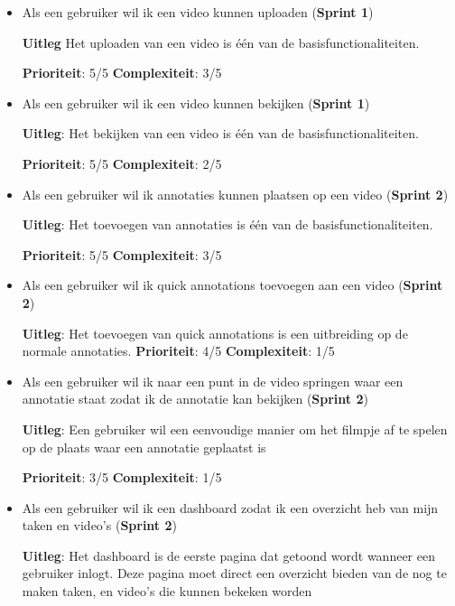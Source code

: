 \begin{itemize}
\setlength\itemsep{2em}
 \item Als een gebruiker wil ik een video kunnen uploaden (\textbf{Sprint 1})
        
        \textbf{Uitleg} Het uploaden van een video is \'e\'en van de basisfunctionaliteiten.
        
        \textbf{Prioriteit}: 5/5  \textbf{Complexiteit}: 3/5
        
 \item Als een gebruiker wil ik een video kunnen bekijken (\textbf{Sprint 1})

        \textbf{Uitleg}: Het bekijken van een video is \'e\'en van de basisfunctionaliteiten.

        \textbf{Prioriteit}: 5/5 \textbf{Complexiteit}: 2/5
        
 \item Als een gebruiker wil ik annotaties kunnen plaatsen op een video (\textbf{Sprint 2})

        \textbf{Uitleg}: Het toevoegen van annotaties is \'e\'en van de basisfunctionaliteiten.

        \textbf{Prioriteit}: 5/5 \textbf{Complexiteit}: 3/5
 \item Als een gebruiker wil ik quick annotations toevoegen aan een video (\textbf{Sprint 2})
        
        \textbf{Uitleg}: Het toevoegen van quick annotations is een uitbreiding op de normale annotaties.
            \textbf{Prioriteit}: 4/5 \textbf{Complexiteit}: 1/5

            
 \item  Als een gebruiker wil ik naar een punt in de video springen waar een annotatie staat zodat ik de annotatie kan bekijken (\textbf{Sprint 2})

        \textbf{Uitleg}: Een gebruiker wil een eenvoudige manier om het filmpje af te spelen op de plaats waar een annotatie geplaatst is

        \textbf{Prioriteit}: 3/5 \textbf{Complexiteit}: 1/5
 \item Als een gebruiker wil ik een dashboard zodat ik een overzicht heb van mijn taken en video's (\textbf{Sprint 2})

        \textbf{Uitleg}: Het dashboard is de eerste pagina dat getoond wordt wanneer een gebruiker inlogt. Deze pagina moet direct een overzicht bieden van de nog te maken taken, en video's die kunnen bekeken worden


\end{itemize}
